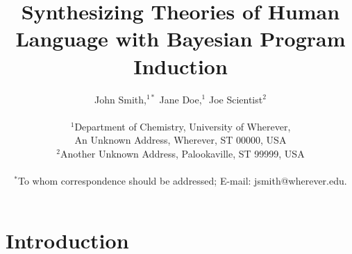 \documentclass[12pt]{article}
\title{Synthesizing Theories of Human Language with Bayesian Program Induction}
\author
{John Smith,$^{1\ast}$ Jane Doe,$^{1}$ Joe Scientist$^{2}$\\
\\
\normalsize{$^{1}$Department of Chemistry, University of Wherever,}\\
\normalsize{An Unknown Address, Wherever, ST 00000, USA}\\
\normalsize{$^{2}$Another Unknown Address, Palookaville, ST 99999, USA}\\
\\
\normalsize{$^\ast$To whom correspondence should be addressed; E-mail:  jsmith@wherever.edu.}
}
\date{}
\newenvironment{sciabstract}{%
\begin{quote} \bf}
{\end{quote}}
\begin{document}
 


\baselineskip24pt


\maketitle 




\begin{sciabstract}
\end{sciabstract}




\section*{Introduction}
\end{document}
